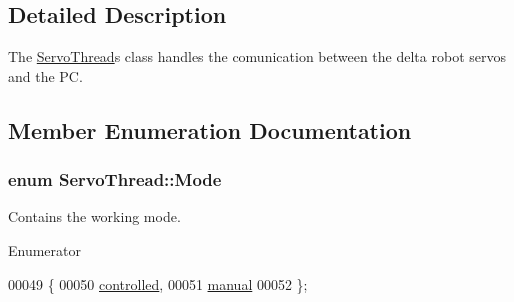 \subsection{Detailed Description}
The \hyperlink{class_servo_thread}{Servo\+Thread}\textquotesingle{}s class handles the comunication between the delta robot servos and the P\+C. 



\subsection{Member Enumeration Documentation}
\hypertarget{class_servo_thread_a8d581034e60792a9995d44065f6140a5}{}
\subsubsection[{Mode}]{\setlength{\rightskip}{0pt plus 5cm}enum {\bf Servo\+Thread\+::\+Mode}}\label{class_servo_thread_a8d581034e60792a9995d44065f6140a5}


Contains the working mode. 

\begin{Desc}
\item[Enumerator]\par
\begin{description}
\item[{\em 
\hypertarget{class_servo_thread_a8d581034e60792a9995d44065f6140a5a6776147f492a4e0b0bb5ee4fdbc8d086}{}controlled\label{class_servo_thread_a8d581034e60792a9995d44065f6140a5a6776147f492a4e0b0bb5ee4fdbc8d086}
}]\item[{\em 
\hypertarget{class_servo_thread_a8d581034e60792a9995d44065f6140a5ae260aa6159d95b94851c96df939b51b3}{}manual\label{class_servo_thread_a8d581034e60792a9995d44065f6140a5ae260aa6159d95b94851c96df939b51b3}
}]\end{description}
\end{Desc}

\begin{DoxyCode}
00049     \{
00050         \hyperlink{class_servo_thread_a8d581034e60792a9995d44065f6140a5a6776147f492a4e0b0bb5ee4fdbc8d086}{controlled},
00051         \hyperlink{class_servo_thread_a8d581034e60792a9995d44065f6140a5ae260aa6159d95b94851c96df939b51b3}{manual}
00052     \};
\end{DoxyCode}
\hypertarget{class_servo_thread_aeccce0ac6a969e2ee7cbe91687e2d085}{}
